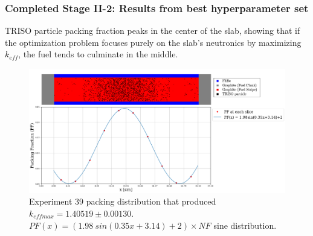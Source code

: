 \begin{frame}
    \frametitle{Completed Stage II-2: Results from best hyperparameter set}
    TRISO particle packing fraction peaks in the center 
    of the slab, showing that if the optimization problem focuses purely on the 
    slab's neutronics by maximizing $k_{eff}$, the fuel tends to culminate in the 
    middle. 

    \begin{figure}[]
        \centering
        \includegraphics[width=0.8\linewidth]{../docs/figures/triso_distribution_sine_39.png} 
        \caption{Experiment 39 packing distribution that produced 
        $k_{eff max} = 1.40519 \pm 0.00130$. 
        $PF(x) = (1.98\ sin(0.35x+3.14)+2)  \times NF$ sine distribution. }
        \label{fig:triso_distribution_sine_39}
    \end{figure}
\end{frame}